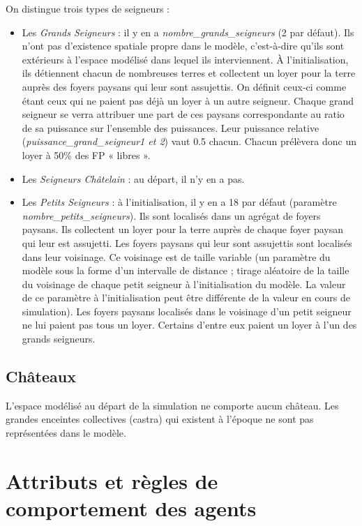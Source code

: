 \documentclass[a4paper,11pt]{article}
\begin{document}
On distingue trois types de seigneurs :
\begin{itemize}
\item Les \textit{Grands Seigneurs} : il y en a \textit{nombre\_grands\_seigneurs} (2 par défaut). Ils n'ont pas d'existence spatiale propre dans le modèle, c'est-à-dire qu'ils sont extérieurs à l'espace modélisé dans lequel ils interviennent. À  l'initialisation, ils détiennent chacun de nombreuses terres et collectent un loyer pour la terre auprès des foyers paysans qui leur sont assujettis.
On définit ceux-ci comme étant ceux qui ne paient pas déjà un loyer à un autre seigneur.
Chaque grand seigneur se verra attribuer une part de ces paysans correspondante au ratio de sa puissance sur l'ensemble des puissances. Leur puissance relative (\textit{puissance\_grand\_seigneur1 et 2}) vaut 0.5 chacun. Chacun prélèvera donc un loyer à 50\% des FP « libres ».

\item Les \textit{Seigneurs Châtelain} : au départ, il n'y en a pas.

\item Les \textit{Petits Seigneurs} : à l'initialisation, il y en a 18 par défaut (paramètre \textit{nombre\_petits\_seigneurs}). Ils sont localisés dans un agrégat de foyers paysans. Ils collectent un loyer pour la terre auprès de chaque foyer paysan qui leur est assujetti. Les foyers paysans qui leur sont assujettis sont localisés dans leur voisinage. Ce voisinage est de taille variable (un paramètre du modèle sous la forme d'un intervalle de distance ; tirage aléatoire de la taille du voisinage de chaque petit seigneur à l'initialisation du modèle. La valeur de ce paramètre à l'initialisation peut être différente de la valeur en cours de simulation). Les foyers paysans localisés dans le voisinage d'un petit seigneur ne lui paient pas tous un loyer. Certains d'entre eux paient un loyer à l'un des grands seigneurs.
\end{itemize}

\subsection{Châteaux}
L'espace modélisé au départ de la simulation ne comporte aucun château. Les grandes enceintes collectives (castra) qui existent à l'époque ne sont pas représentées dans le modèle.


\section[Attributs et règles]{Attributs et règles de comportement des agents}
\end{document}

